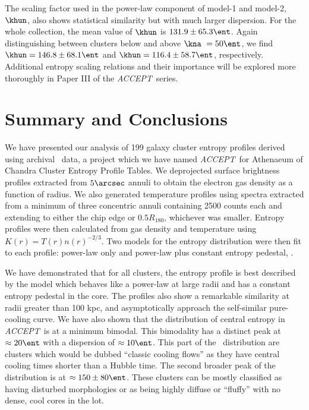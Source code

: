 \documentclass[12pt, preprint]{aastex}
\newcommand{\accept}{\textit{ACCEPT}}
\begin{document}
{{The scaling factor used in the power-law component of model-1 and
model-2, $\khun$, also shows statistical similarity but with much
larger dispersion. For the whole collection, the mean value of
$\khun$ is $131.9 \pm 65.3 \ent$. Again distinguishing
between clusters below and above $\kna\ = 50 \ent$, we find
$\khun = 146.8 \pm 68.1 \ent$ and $\khun = 116.4 \pm 58.7 \ent$,
respectively. Additional entropy scaling relations and their
importance will be explored more thoroughly in Paper III of the
\accept\ series.

\section{Summary and Conclusions}
\label{sec:summary}

We have presented our analysis of 199 galaxy cluster entropy
profiles derived using archival \Chandra\ data, a project which we
have named \accept\ for Athenaeum of Chandra Cluster Entropy Profile
Tables. We deprojected surface brightness profiles extracted from
$5\arcsec$ annuli to obtain the electron gas density as a function of
radius. We also generated temperature profiles using spectra extracted
from a minimum of three concentric annuli containing 2500 counts each
and extending to either the chip edge or $0.5 R_{180}$, whichever was
smaller. Entropy profiles were then calculated from gas density and
temperature using $K(r) = T(r)n(r)^{-2/3}$. Two models for the entropy
distribution were then fit to each profile: power-law only and
power-law plus constant entropy pedestal, \kna.

We have demonstrated that for all clusters, the entropy profile is
best described by the model which behaves like a power-law at large
radii and has a constant entropy pedestal in the core. The profiles
also show a remarkable similarity at radii greater than 100 kpc, and
asymptotically approach the self-similar pure-cooling curve. We have
also shown that the distribution of central entropy in \accept\ is at
a minimum bimodal. This bimodality has a distinct peak at $\approx 20
\ent$ with a dispersion of $\approx 10 \ent$. This part of the
\kna\ distribution are clusters which would be dubbed ``classic cooling
flows'' as they have central cooling times shorter than a Hubble
time. The second broader peak of the distribution is at $\approx 150
\pm 80 \ent$. These clusters can be mostly classified as having
disturbed morphologies or as being highly diffuse or ``fluffy'' with
no dense, cool cores in the lot.

}}
\end{document}
